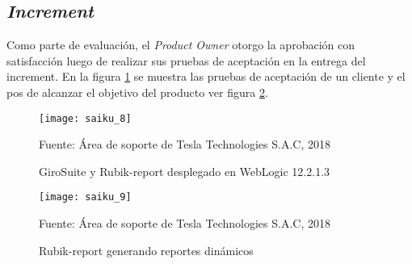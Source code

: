 \begin{spacing}{1.5}
	\subsection{\textit{Increment}}
	Como parte de evaluaci\'{o}n, el \textit{Product Owner} otorgo la aprobaci\'{o}n con satisfacci\'{o}n luego de realizar sus pruebas de aceptaci\'{o}n en la entrega del increment.
	En la figura \ref{figure:chaperIII_11} se muestra las pruebas de aceptaci\'{o}n de un cliente y el pos de alcanzar el objetivo del producto ver figura \ref{figure:chaperIII_12}.
	
	\begin{figure}[H]
		\centering
		\texttt{[image: saiku\_8]}
		\caption {\centering \small{GiroSuite y Rubik-report desplegado en WebLogic 12.2.1.3}} \label{figure:chaperIII_11}
		\small {Fuente: \'{A}rea de soporte de Tesla Technologies S.A.C, 2018}
	\end{figure}
	
		\begin{figure}[H]
		\centering
		\texttt{[image: saiku\_9]}
		\caption {\centering \small{Rubik-report generando reportes din\'{a}micos}} \label{figure:chaperIII_12}
		\small {Fuente: \'{A}rea de soporte de Tesla Technologies S.A.C, 2018}
	\end{figure}	
	
	
	
\end{spacing}